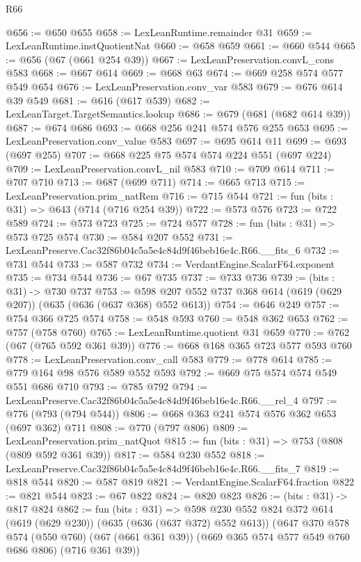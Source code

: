 \begin{lexlean}{R66}
\begin{coremodule}
@656 := @650 @655
@658 := LexLeanRuntime.remainder @31
@659 := LexLeanRuntime.instQuotientNat
@660 := @658 @659
@661 := @660 @544
@665 := @656 (@67 (@661 @254 @39))
@667 := LexLeanPreservation.convL_cons @583
@668 := @667 @614
@669 := @668 @63
@674 := @669 @258 @574 @577 @549 @654
@676 := LexLeanPreservation.conv_var @583
@679 := @676 @614 @39 @549
@681 := @616 (@617 @539)
@682 := LexLeanTarget.TargetSemantics.lookup
@686 := @679 (@681 (@682 @614 @39))
@687 := @674 @686
@693 := @668 @256 @241 @574 @576 @255 @653
@695 := LexLeanPreservation.conv_value @583
@697 := @695 @614 @11
@699 := @693 (@697 @255)
@707 := @668 @225 @75 @574 @574 @224 @551 (@697 @224)
@709 := LexLeanPreservation.convL_nil @583
@710 := @709 @614
@711 := @707 @710
@713 := @687 (@699 @711)
@714 := @665 @713
@715 := LexLeanPreservation.prim_natRem
@716 := @715 @544
@721 := fun (bits : @31) => @643 (@714 (@716 @254 @39))
@722 := @573 @576
@723 := @722 @589
@724 := @573 @723
@725 := @724 @577
@728 := fun (bits : @31) => @573 @725 @574
@730 := @584 @207 @552
@731 := LexLeanPreserve.Cac32f86b04c5a5e4c84d9f46beb16e4c.R66.__fits_6
@732 := @731 @544
@733 := @587 @732
@734 := VerdantEngine.ScalarF64.exponent
@735 := @734 @544
@736 := @67 @735
@737 := @733 @736
@739 := (bits : @31) -> @730 @737
@753 := @598 @207 @552 @737 @368 @614 (@619 (@629 @207)) (@635 (@636 (@637 @368) @552 @613))
@754 := @646 @249
@757 := @754 @366 @725 @574
@758 := @548 @593
@760 := @548 @362 @653
@762 := @757 (@758 @760)
@765 := LexLeanRuntime.quotient @31 @659
@770 := @762 (@67 (@765 @592 @361 @39))
@776 := @668 @168 @365 @723 @577 @593 @760
@778 := LexLeanPreservation.conv_call @583
@779 := @778 @614
@785 := @779 @164 @98 @576 @589 @552 @593
@792 := @669 @75 @574 @574 @549 @551 @686 @710
@793 := @785 @792
@794 := LexLeanPreserve.Cac32f86b04c5a5e4c84d9f46beb16e4c.R66.__rel_4
@797 := @776 (@793 (@794 @544))
@806 := @668 @363 @241 @574 @576 @362 @653 (@697 @362) @711
@808 := @770 (@797 @806)
@809 := LexLeanPreservation.prim_natQuot
@815 := fun (bits : @31) => @753 (@808 (@809 @592 @361 @39))
@817 := @584 @230 @552
@818 := LexLeanPreserve.Cac32f86b04c5a5e4c84d9f46beb16e4c.R66.__fits_7
@819 := @818 @544
@820 := @587 @819
@821 := VerdantEngine.ScalarF64.fraction
@822 := @821 @544
@823 := @67 @822
@824 := @820 @823
@826 := (bits : @31) -> @817 @824
@862 := fun (bits : @31) =>
  @598
    @230
    @552
    @824
    @372
    @614
    (@619 (@629 @230))
    (@635 (@636 (@637 @372) @552 @613))
    (@647
      @370
      @578
      @574
      (@550 @760)
      (@67 (@661 @361 @39))
      (@669 @365 @574 @577 @549 @760 @686 @806)
      (@716 @361 @39))

\end{coremodule}
\end{lexlean}
